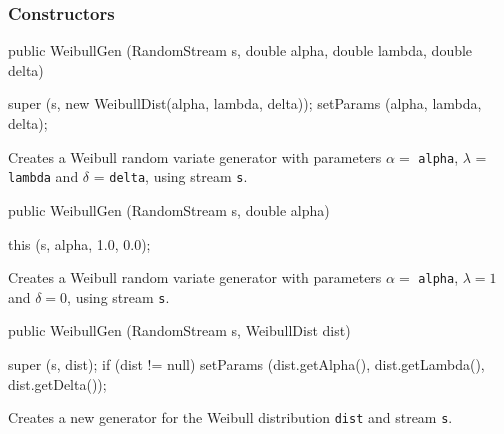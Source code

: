 \subsubsection* {Constructors}
\begin{code}

   public WeibullGen (RandomStream s, double alpha, double lambda,
                                      double delta) \begin{hide} {
      super (s, new WeibullDist(alpha, lambda, delta));
      setParams (alpha, lambda, delta);
   }\end{hide}
\end{code} 
\begin{tabb} Creates a Weibull random variate generator with parameters
 $\alpha =$ \texttt{alpha}, $\lambda $ = \texttt{lambda} and $\delta$ =
  \texttt{delta}, using stream \texttt{s}. 
\end{tabb}
\begin{code}

   public WeibullGen (RandomStream s, double alpha) \begin{hide} {
      this (s, alpha, 1.0, 0.0);
   }\end{hide}
\end{code} 
\begin{tabb} Creates a Weibull random variate generator with parameters
 $\alpha =$ \texttt{alpha}, $\lambda = 1$ and $\delta = 0$, using stream
 \texttt{s}. 
\end{tabb}
\begin{code}
   
   public WeibullGen (RandomStream s, WeibullDist dist) \begin{hide} {
      super (s, dist);
      if (dist != null)
         setParams (dist.getAlpha(), dist.getLambda(), dist.getDelta());
   } \end{hide}
\end{code}
\begin{tabb} Creates a new generator for the Weibull distribution \texttt{dist}
   and stream \texttt{s}. 
\end{tabb}


